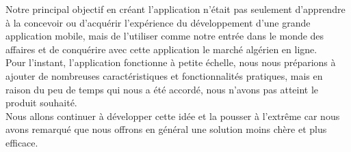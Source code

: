 \documentclass[french, a4paper, 12pt]{report}
\begin{document}
Notre principal objectif en créant l'application n'était pas seulement d'apprendre à la concevoir ou d'acquérir l'expérience du développement d'une grande application mobile, mais de l'utiliser comme notre entrée dans le monde des affaires et de conquérire avec cette application le marché algérien en ligne.\\


Pour l'instant, l'application fonctionne à petite échelle, nous nous préparions à ajouter de nombreuses caractéristiques et fonctionnalités pratiques, mais en raison du peu de temps qui nous a été accordé, nous n'avons pas atteint le produit souhaité.\\


Nous allons continuer à développer cette idée et la pousser à l'extrême car nous avons remarqué que nous offrons en général une solution moins chère et plus efficace.


\newpage
\begin{thebibliography}{300}
\end{thebibliography}
\end{document}
